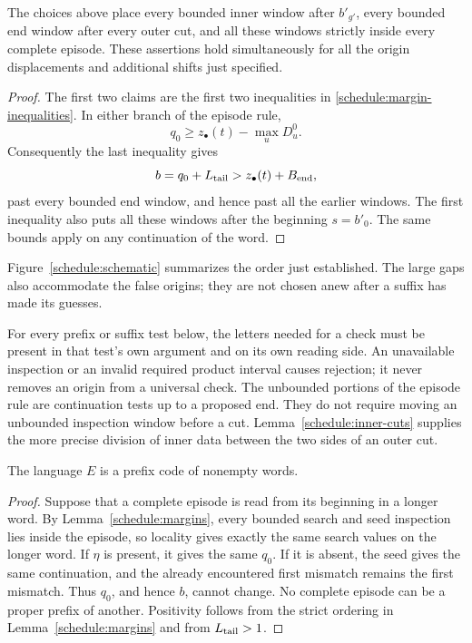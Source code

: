 \begin{lemma}
\label{schedule:margins}
The choices above place every bounded inner window after $b'_{g'}$, every
bounded end window after every outer cut, and all these windows strictly
inside every complete episode.  These assertions hold simultaneously for
all the origin displacements and additional shifts just specified.
\end{lemma}

\begin{proof}
The first two claims are the first two inequalities in
\eqref{schedule:margin-inequalities}.  In either branch of the episode
rule,
\[
 q_0\ge z_\bullet(t)-\max_uD_u^0.
\]
Consequently the last inequality gives
\[
 b=q_0+L_{\rm tail}>z_\bullet(t)+B_{\rm end},
\]
past every bounded end window, and hence past all the earlier windows.
The first inequality also puts all these windows after the beginning
$s=b'_0$.  The same bounds apply on any continuation of the word.
\end{proof}

Figure~\ref{schedule:schematic} summarizes the order just established.  The
large gaps also accommodate the false origins; they are not chosen anew
after a suffix has made its guesses.

\FloatBarrier

For every prefix or suffix test below, the letters needed for a check
must be present in that test's own argument and on its own reading side.
An unavailable inspection or an invalid required product interval causes
rejection; it never removes an origin from a universal check.  The
unbounded portions of the episode rule are continuation tests up to a
proposed end.  They do not require moving an unbounded inspection window
before a cut.  Lemma~\ref{schedule:inner-cuts} supplies the more precise
division of inner data between the two sides of an outer cut.

\begin{lemma}\label{episode:prefix-code}
The language $E$ is a prefix code of nonempty words.
\end{lemma}

\begin{proof}
Suppose that a complete episode is read from its beginning in a longer
word.  By Lemma~\ref{schedule:margins}, every bounded search and seed
inspection lies inside the episode, so locality gives exactly the same
search values on the longer word.  If $\eta$ is present, it gives the same
$q_0$.  If it is absent, the seed gives the same continuation, and the
already encountered first mismatch remains the first mismatch.  Thus
$q_0$, and hence $b$, cannot change.  No complete episode can be a proper
prefix of another.  Positivity follows from the strict ordering in
Lemma~\ref{schedule:margins} and from $L_{\rm tail}>1$.
\end{proof}

